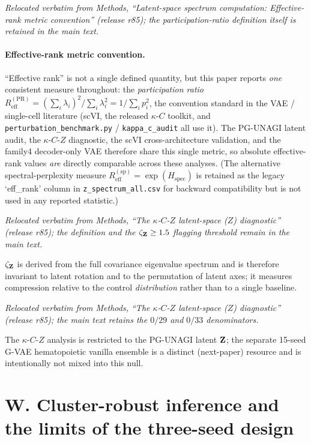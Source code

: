 \documentclass[11 pt,a4 paper]{article}
\begin{document}
\noindent\emph{Relocated verbatim from Methods, ``Latent-space spectrum computation: Effective-rank metric convention'' (release r85); the participation-ratio definition itself is retained in the main text.}

\paragraph*{Effective-rank metric convention.}
``Effective rank'' is not a single defined quantity, but this paper reports \emph{one} consistent measure throughout: the \emph{participation ratio} $R_{\mathrm{eff}}^{(\mathrm{PR})}=(\sum_i\lambda_i)^2/\sum_i\lambda_i^2=1/\sum_i p_i^2$, the convention standard in the VAE / single-cell literature (scVI, the released $\kappa$-$C$ toolkit, and \texttt{perturbation\_benchmark.py} / \texttt{kappa\_c\_audit} all use it). The PG-UNAGI latent audit, the $\kappa$-$C$-$Z$ diagnostic, the scVI cross-architecture validation, and the family4 decoder-only VAE therefore share this single metric, so absolute effective-rank values \emph{are} directly comparable across these analyses. (The alternative spectral-perplexity measure $R_{\mathrm{eff}}^{(\mathrm{sp})}=\exp(H_{\mathrm{spec}})$ is retained as the legacy `eff\_rank' column in \texttt{z\_spectrum\_all.csv} for backward compatibility but is not used in any reported statistic.)

\noindent\emph{Relocated verbatim from Methods, ``The $\kappa$-$C$-$Z$ latent-space ($Z$) diagnostic'' (release r85); the definition and the $\zeta_{\mathbf{Z}}\geq1.5$ flagging threshold remain in the main text.}

$\zeta_{\mathbf{Z}}$ is derived from the full covariance eigenvalue spectrum and is therefore invariant to latent rotation and to the permutation of latent axes; it measures compression relative to the control \emph{distribution} rather than to a single baseline.

\noindent\emph{Relocated verbatim from Methods, ``The $\kappa$-$C$-$Z$ latent-space ($Z$) diagnostic'' (release r85); the main text retains the $0/29$ and $0/33$ denominators.}

The $\kappa$-$C$-$Z$ analysis is restricted to the PG-UNAGI latent $\mathbf{Z}$; the separate 15-seed G-VAE hematopoietic vanilla ensemble is a distinct (next-paper) resource and is intentionally not mixed into this null.


\clearpage

\section*{W. Cluster-robust inference and the limits of the three-seed design}
\end{document}
